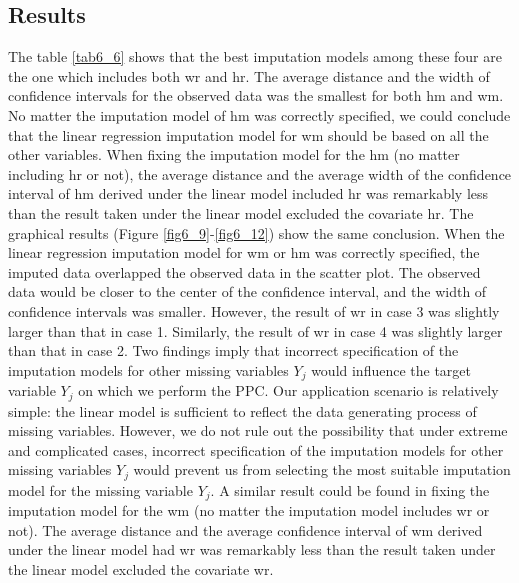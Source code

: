 	\subsection{Results}
	The table \ref{tab6_6} shows that the best imputation models among these four are the one which includes both wr and hr. The average distance and the width of confidence intervals for the observed data was the smallest for both hm and wm. No matter the imputation model of hm was correctly specified, we could conclude that the linear regression imputation model for wm should be based on all the other variables. When fixing the imputation model for the hm (no matter including hr or not), the average distance and the average width of the confidence interval of hm derived under the linear model included hr was remarkably less than the result taken under the linear model excluded the covariate hr. The graphical results (Figure \ref{fig6_9}-\ref{fig6_12}) show the same conclusion. When the linear regression imputation model for wm or hm was correctly specified, the imputed data overlapped the observed data in the scatter plot. The observed data would be closer to the center of the confidence interval, and the width of confidence intervals was smaller. However, the result of wr in case 3 was slightly larger than that in case 1. Similarly, the result of wr in case 4 was slightly larger than that in case 2. Two findings imply that incorrect specification of the imputation models for other missing variables $Y_j$ would influence the target variable $Y_j$ on which we perform the PPC. Our application scenario is relatively simple: the linear model is sufficient to reflect the data generating process of missing variables. However, we do not rule out the possibility that under extreme and complicated cases, incorrect specification of the imputation models for other missing variables $Y_j$ would prevent us from selecting the most suitable imputation model for the missing variable $Y_j$. A similar result could be found in fixing the imputation model for the wm (no matter the imputation model includes wr or not). The average distance and the average confidence interval of wm derived under the linear model had wr was remarkably less than the result taken under the linear model excluded the covariate wr.
	
